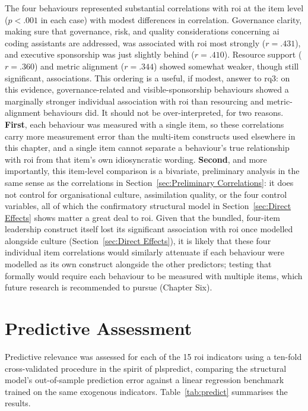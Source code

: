 The four behaviours represented substantial correlations with \gls{roi} at the item level ($p < .001$ in each case) with modest differences in correlation. Governance clarity, making sure that governance, risk, and quality considerations concerning \gls{ai} coding assistants are addressed, was associated with \gls{roi} most strongly ($r = .431$), and executive sponsorship was just slightly behind ($r = .410$). Resource support ($r = .360$) and metric alignment ($r = .344$) showed somewhat weaker, though still significant, associations. This ordering is a useful, if modest, answer to \gls{rq3}: on this evidence, governance-related and visible-sponsorship behaviours showed a marginally stronger individual association with \gls{roi} than resourcing and metric-alignment behaviours did. It should not be over-interpreted, for two reasons. \textbf{First}, each behaviour was measured with a single item, so these correlations carry more measurement error than the multi-item constructs used elsewhere in this chapter, and a single item cannot separate a behaviour's true relationship with \gls{roi} from that item's own idiosyncratic wording. \textbf{Second}, and more importantly, this item-level comparison is a bivariate, preliminary analysis in the same sense as the correlations in Section~\ref{sec:Preliminary Correlations}: it does not control for organisational culture, assimilation quality, or the four control variables, all of which the confirmatory structural model in Section~\ref{sec:Direct Effects} shows matter a great deal to \gls{roi}. Given that the bundled, four-item leadership construct itself lost its significant association with \gls{roi} once modelled alongside culture (Section~\ref{sec:Direct Effects}), it is likely that these four individual item correlations would similarly attenuate if each behaviour were modelled as its own construct alongside the other predictors; testing that formally would require each behaviour to be measured with multiple items, which future research is recommended to pursue (Chapter Six).

\section{Predictive Assessment}
\label{sec:Predictive Assessment}
Predictive relevance was assessed for each of the 15 \gls{roi} indicators using a ten-fold cross-validated procedure in the spirit of \gls{plspredict}, comparing the structural model's out-of-sample prediction error against a linear regression benchmark trained on the same exogenous indicators. Table~\ref{tab:predict} summarises the results.

